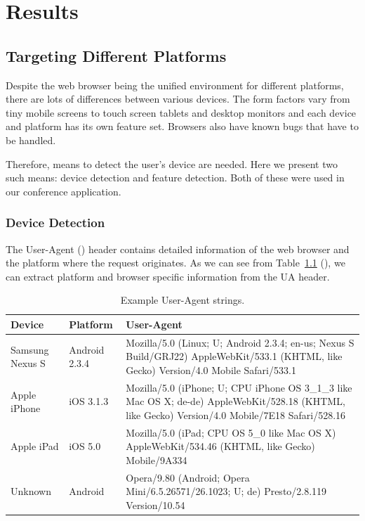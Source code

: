 \chapter{Results}
\label{chapter:results}


\section{Targeting Different Platforms}
\label{section:targeting-platforms}

Despite the web browser being the unified environment for different
platforms, there are lots of differences between various devices. The
form factors vary from tiny mobile screens to touch screen tablets and
desktop monitors and each device and platform has its own feature
set. Browsers also have known bugs that have to be handled.

Therefore, means to detect the user's device are needed. Here we
present two such means: device detection and feature detection. Both
of these were used in our conference application.

\subsection{Device Detection}
\label{subsection:device-detection}

The User-Agent ()  header contains detailed
information of the web browser and the platform where the request
originates. As we can see from Table~\ref{table:user-agents}
(), we can extract platform and browser
specific information from the UA header.

\begin{table}
  \begin{tabular}{ l | l | p{7cm} }
    \textbf{Device} & \textbf{Platform} & \textbf{User-Agent} \\ \hline
    Samsung Nexus S & Android 2.3.4 & Mozilla/5.0 (Linux; U; Android 2.3.4; en-us; Nexus S Build/GRJ22) AppleWebKit/533.1 (KHTML, like Gecko) Version/4.0 Mobile Safari/533.1 \\ \hline
    Apple iPhone & iOS 3.1.3 & Mozilla/5.0 (iPhone; U; CPU iPhone OS 3\_1\_3 like Mac OS X; de-de) AppleWebKit/528.18 (KHTML, like Gecko) Version/4.0 Mobile/7E18 Safari/528.16 \\ \hline
    Apple iPad & iOS 5.0 & Mozilla/5.0 (iPad; CPU OS 5\_0 like Mac OS X) AppleWebKit/534.46 (KHTML, like Gecko) Mobile/9A334 \\ \hline
    Unknown & Android & Opera/9.80 (Android; Opera Mini/6.5.26571/26.1023; U; de) Presto/2.8.119 Version/10.54 \\ \hline
  \end{tabular}
  \label{table:user-agents}
  \caption{Example User-Agent strings.}
\end{table}

